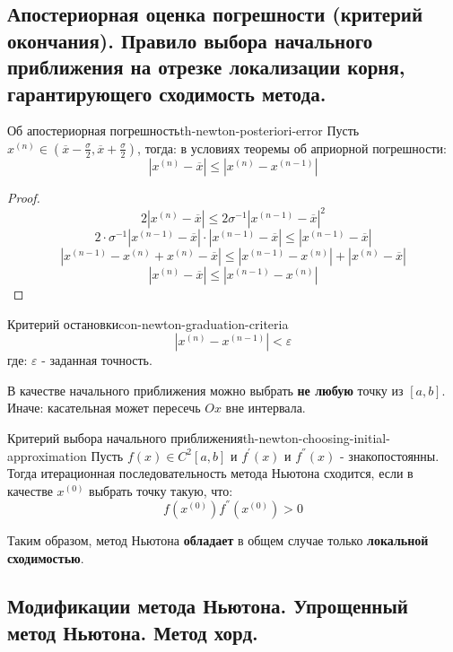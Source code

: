 \documentclass[14pt]{extarticle}
\begin{document}
\clearpage
\subsection{Апостериорная оценка погрешности (критерий окончания). Правило выбора начального приближения на отрезке локализации корня, гарантирующего сходимость метода.}

    \begin{theorem}{Об апостериорная погрешность}{th-newton-posteriori-error}
        Пусть $x^{(n)} \in (\overline{x} - \frac{\sigma}{2}, \overline{x} + \frac{\sigma}{2})$, тогда: в условиях теоремы об априорной погрешности:
        $$|x^{(n)} - \overline{x}| \leq |x^{(n)} - x^{(n - 1)}|$$
    
        \begin{proof}
            $$2|x^{(n)} - \overline{x}| \leq 2 \sigma^{-1} |x^{(n - 1)} - \overline{x}|^{2}$$
            $$2 \cdot \sigma^{-1} |x^{(n - 1)} - \overline{x}| \cdot |x^{(n - 1)} - \overline{x}| \leq |x^{(n-1)} - \overline{x}|$$
            $$|x^{(n-1)} - x^{(n)} + x^{(n)} - \overline{x}| \leq |x^{(n-1)} - x^{(n)}| + |x^{(n)} - \overline{x}|$$
            $$|x^{(n)} - \overline{x}| \leq |x^{(n-1)} - x^{(n)}|$$
        \end{proof}
    \end{theorem}

    \begin{consequence}{Критерий остановки}{con-newton-graduation-criteria}
        $$|x^{(n)} - x^{(n - 1)}| < \varepsilon$$
        где: $\varepsilon$ - заданная точность.
    \end{consequence}

    В качестве начального приближения можно выбрать \textbf{не любую} точку из $[a, b]$. Иначе: касательная может пересечь $Ox$ вне интервала.

    \begin{theorem}{Критерий выбора начального приближения}{th-newton-choosing-initial-approximation}
        Пусть $f(x) \in C^{2}[a, b]$ и $f^{'}(x)$ и $f^{''}(x)$ - знакопостоянны.\\
        Тогда итерационная последовательность метода Ньютона сходится, если в качестве $x^{(0)}$ выбрать точку такую, что:
        $$f(x^{(0)})f^{''}(x^{(0)}) > 0$$

        Таким образом, метод Ньютона \textbf{обладает} в общем случае только \textbf{локальной сходимостью}.
    \end{theorem}

\clearpage
\subsection{Модификации метода Ньютона. Упрощенный метод Ньютона. Метод хорд.}
\end{document}
